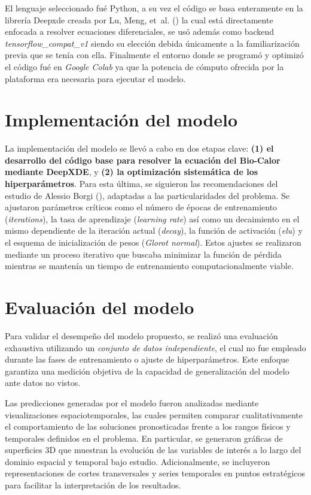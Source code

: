 \documentclass[
  spanish,
  us-letterpaper,
  DIV=11,
  numbers=noendperiod]{scrreprt}
\theoremstyle{plain}
\theoremstyle{definition}
\theoremstyle{remark}
\begin{document}
El lenguaje seleccionado fué Python, a su vez el código se basa
enteramente en la librería Deepxde creada por Lu, Meng, et~al.
() la cual está directamente enfocada a
resolver ecuaciones diferenciales, se usó además como backend
\emph{tensorflow\_compat\_v1} siendo su elección debida únicamente a la
familiarización previa que se tenía con ella. Finalmente el entorno
donde se programó y optimizó el código fué en \emph{Google Colab} ya que
la potencia de cómputo ofrecida por la plataforma era necesaria para
ejecutar el modelo.

\section{Implementación del modelo}\label{implementaciuxf3n-del-modelo}

La implementación del modelo se llevó a cabo en dos etapas clave:
\textbf{(1) el desarrollo del código base para resolver la ecuación del
Bio-Calor mediante DeepXDE}, y \textbf{(2) la optimización sistemática
de los hiperparámetros}. Para esta última, se siguieron las
recomendaciones del estudio de Alessio Borgi
(), adaptadas a las particularidades del
problema. Se ajustaron parámetros críticos como el número de épocas de
entrenamiento (\emph{iterations}), la tasa de aprendizaje
(\emph{learning rate}) así como un decaimiento en el mismo dependiente
de la iteración actual (\emph{decay}), la función de activación
(\emph{elu}) y el esquema de inicialización de pesos (\emph{Glorot
normal}). Estos ajustes se realizaron mediante un proceso iterativo que
buscaba minimizar la función de pérdida mientras se mantenía un tiempo
de entrenamiento computacionalmente viable.

\section{Evaluación del modelo}\label{evaluaciuxf3n-del-modelo}

Para validar el desempeño del modelo propuesto, se realizó una
evaluación exhaustiva utilizando un \emph{conjunto de datos
independiente}, el cual no fue empleado durante las fases de
entrenamiento o ajuste de hiperparámetros. Este enfoque garantiza una
medición objetiva de la capacidad de generalización del modelo ante
datos no vistos.

Las predicciones generadas por el modelo fueron analizadas mediante
visualizaciones espaciotemporales, las cuales permiten comparar
cualitativamente el comportamiento de las soluciones pronosticadas
frente a los rangos físicos y temporales definidos en el problema. En
particular, se generaron gráficas de superficies 3D que muestran la
evolución de las variables de interés a lo largo del dominio espacial y
temporal bajo estudio. Adicionalmente, se incluyeron representaciones de
cortes transversales y series temporales en puntos estratégicos para
facilitar la interpretación de los resultados.
\end{document}

